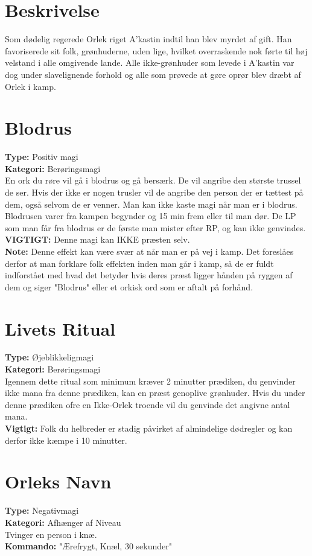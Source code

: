 \section{Beskrivelse}
Som dødelig regerede Orlek riget A’kastin indtil han blev myrdet af gift. Han favoriserede sit folk, grønhuderne, uden lige, hvilket overraskende nok førte til høj velstand i alle omgivende lande. Alle ikke-grønhuder som levede i A’kastin var dog under slavelignende forhold og alle som prøvede at gøre oprør blev dræbt af Orlek i kamp.

\section{Blodrus}
\textbf{Type:} Positiv magi\\
\textbf{Kategori:} Berøringsmagi\\
En ork du røre vil gå i blodrus og gå bersærk. De vil angribe den største trussel de ser. Hvis der ikke er nogen trusler vil de angribe den person der er tættest på dem, også selvom de er venner. Man kan ikke kaste magi når man er i blodrus.
Blodrusen varer fra kampen begynder og 15 min frem eller til man dør. De LP som man får fra blodrus er de første man mister efter RP, og kan ikke genvindes.\\
\textbf{VIGTIGT:} Denne magi kan IKKE præsten selv.\\
\textbf{Note:} Denne effekt kan være svær at når man er på vej i kamp. Det foreslåes derfor at man forklare folk effekten inden man går i kamp, så de er fuldt indforstået med hvad det betyder hvis deres præst ligger hånden på ryggen af dem og siger "Blodrus" eller et orkisk ord som er aftalt på forhånd.

\section{Livets Ritual}
\textbf{Type:} Øjeblikkeligmagi\\ 
\textbf{Kategori:} Berøringsmagi\\
Igennem dette ritual som minimum kræver 2 minutter prædiken, du genvinder ikke mana fra denne prædiken, kan en præst genoplive grønhuder. Hvis du under denne prædiken ofre en Ikke-Orlek troende vil du genvinde det angivne antal mana.\\
\textbf{Vigtigt:} Folk du helbreder er stadig påvirket af almindelige dødregler og kan derfor ikke kæmpe i 10 minutter.

\section{Orleks Navn}
\textbf{Type:} Negativmagi\\ 
\textbf{Kategori:} Afhænger af Niveau\\
Tvinger en person i knæ.\\
\textbf{Kommando:} "Ærefrygt, Knæl, 30 sekunder"

